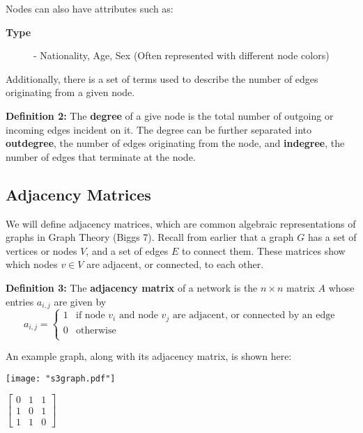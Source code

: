 \documentclass{article}
\begin{document}
\bigskip

\noindent Nodes can also have attributes such as:
\bigskip
\begin{description}
  \item[\textbf{Type}] - Nationality, Age, Sex (Often represented with different node colors)
\end{description}
\bigskip

Additionally, there is a set of terms used to describe the number of edges originating from a given node.

\bigskip

\textbf{Definition 2:} The \textbf{degree} of a give node is the total number of outgoing or incoming edges incident on it. 
The degree can be further separated into \textbf{outdegree}, the number of edges originating from the node, and \textbf{indegree},
the number of edges that terminate at the node.

\subsection*{Adjacency Matrices}
We will define adjacency matrices, which are common algebraic representations of graphs in Graph Theory (Biggs 7).
Recall from earlier that a graph $G$ has a set of vertices or nodes $V$, and a set of edges $E$ to connect them.
These matrices show which nodes $v \in V$ are adjacent, or connected, to each other.

\bigskip

\textbf{Definition 3:} The \textbf{adjacency matrix} of a network is the $n \times n$ matrix $A$ whose entries $a_{i,j}$ are given by
\[   
a_{i,j} = 
     \begin{cases}
       1 & \text{if node } v_i \text{ and node } v_j \text{ are adjacent, or connected by an edge} \\
       0 & \text{otherwise} \\
     \end{cases}
\]

\bigskip

An example graph, along with its adjacency matrix, is shown here:

\bigskip

\noindent\begin{minipage}{.5\textwidth}
\centering
\texttt{[image: "s3graph.pdf"]}
\label{fig:fig1}            
\end{minipage}%
\begin{minipage}{.5\textwidth}
\centering
\vspace{1.2cm}
$\begin{bmatrix}
0 & 1 & 1\\
1 & 0 & 1\\
1 & 1 & 0
\end{bmatrix}$
\vspace{1.1cm}

\label{fig:fig2}            
\end{minipage}
\end{document}
